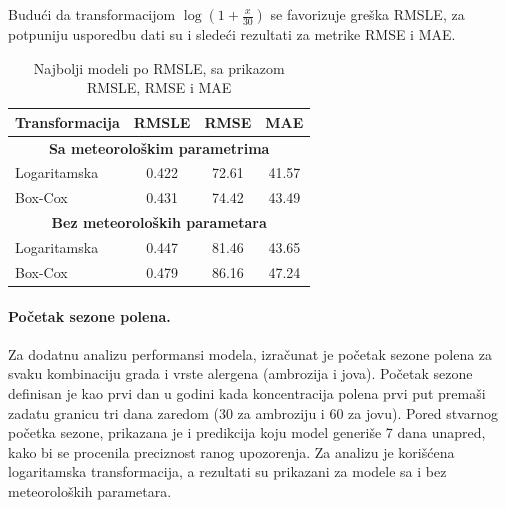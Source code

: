 \documentclass[12pt]{article}
\begin{document}
Budući da transformacijom $\log(1+\frac{x}{30})$ se favorizuje greška RMSLE, za potpuniju usporedbu dati su i sledeći rezultati za metrike RMSE i MAE.

\begin{table}[h!]
\centering
\caption{Najbolji modeli po RMSLE, sa prikazom RMSLE, RMSE i MAE}
\label{tab:best_models_metrics}
\begin{tabular}{|l|c|c|c|}
\hline
\textbf{Transformacija} & \textbf{RMSLE} & \textbf{RMSE} & \textbf{MAE} \\ \hline
\multicolumn{4}{|c|}{\textbf{Sa meteorološkim parametrima}} \\ \hline
Logaritamska      & 0.422 & 72.61 & 41.57 \\  \hline
Box-Cox  & 0.431 & 74.42 & 43.49 \\ \hline
\multicolumn{4}{|c|}{\textbf{Bez meteoroloških parametara}} \\ \hline
Logaritamska      & 0.447 & 81.46 & 43.65 \\  \hline
Box-Cox  & 0.479 & 86.16 & 47.24 \\ \hline
\end{tabular}
\end{table}

\paragraph{Početak sezone polena.}  
Za dodatnu analizu performansi modela, izračunat je početak sezone polena za svaku kombinaciju grada i vrste alergena (ambrozija i jova). Početak sezone definisan je kao prvi dan u godini kada koncentracija polena prvi put premaši zadatu granicu tri dana zaredom (30 za ambroziju i 60 za jovu). Pored stvarnog početka sezone, prikazana je i predikcija koju model generiše 7 dana unapred, kako bi se procenila preciznost ranog upozorenja. Za analizu je korišćena logaritamska transformacija, a rezultati su prikazani za modele sa i bez meteoroloških parametara.
\end{document}
